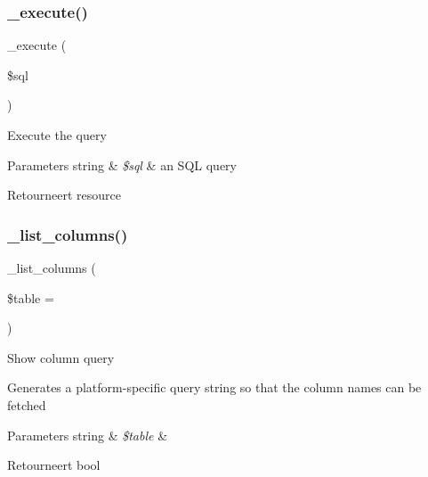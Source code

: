 \subsubsection{\texorpdfstring{\_execute()}{\_execute()}}
{\footnotesize\ttfamily \+\_\+execute (\begin{DoxyParamCaption}\item[{}]{\$sql }\end{DoxyParamCaption})\hspace{0.3cm}{\ttfamily [protected]}}

Execute the query


\begin{DoxyParams}[1]{Parameters}
string & {\em \$sql} & an S\+QL query \\
\hline
\end{DoxyParams}
\begin{DoxyReturn}{Retourneert}
resource 
\end{DoxyReturn}
\mbox{\label{class_c_i___d_b__sqlite__driver_a7ccb7f9c301fe7f0a9db701254142b63}} 
\subsubsection{\texorpdfstring{\_list\_columns()}{\_list\_columns()}}
{\footnotesize\ttfamily \+\_\+list\+\_\+columns (\begin{DoxyParamCaption}\item[{}]{\$table = {\ttfamily \textquotesingle{}\textquotesingle{}} }\end{DoxyParamCaption})\hspace{0.3cm}{\ttfamily [protected]}}

Show column query

Generates a platform-\/specific query string so that the column names can be fetched


\begin{DoxyParams}[1]{Parameters}
string & {\em \$table} & \\
\hline
\end{DoxyParams}
\begin{DoxyReturn}{Retourneert}
bool 
\end{DoxyReturn}
\mbox{\label{class_c_i___d_b__sqlite__driver_a435c0f3ce54fe7daa178baa8532ebd54}} 
